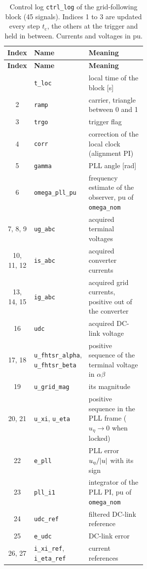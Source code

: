 \documentclass[11pt,a4paper]{scrartcl}
\newcommand{\ped}[1]{_{\mathrm{#1}}}
\newcommand{\code}[1]{\texttt{#1}}
\begin{document}
\begin{onehalfspace}
\small
\begin{longtable}{@{} c l p{0.56\linewidth} @{}}
	\caption[Control log of the grid-following block.]{Control log \code{ctrl\_log} of the grid-following block (45 signals). Indices 1 to 3 are updated every step $t\ped{c}$, the others at the trigger and held in between. Currents and voltages in pu.} \label{tab:log_gfl} \\
	\toprule
	\textbf{Index} & \textbf{Name} & \textbf{Meaning} \\
	\midrule
	\endfirsthead
	\toprule
	\textbf{Index} & \textbf{Name} & \textbf{Meaning} \\
	\midrule
	\endhead
	\bottomrule
	\endfoot
	\bottomrule
	\endlastfoot
	1 & \code{t\_loc} & local time of the block [\si{\second}] \\
	2 & \code{ramp} & carrier, triangle between 0 and 1 \\
	3 & \code{trgo} & trigger flag \\
	4 & \code{corr} & correction of the local clock (alignment PI) \\
	5 & \code{gamma} & PLL angle [\si{\radian}] \\
	6 & \code{omega\_pll\_pu} & frequency estimate of the observer, pu of \code{omega\_nom} \\
	7, 8, 9 & \code{ug\_abc} & acquired terminal voltages \\
	10, 11, 12 & \code{is\_abc} & acquired converter currents \\
	13, 14, 15 & \code{ig\_abc} & acquired grid currents, positive out of the converter \\
	16 & \code{udc} & acquired DC-link voltage \\
	17, 18 & \code{u\_fhtsr\_alpha}, \code{u\_fhtsr\_beta} & positive sequence of the terminal voltage in $\alpha\beta$ \\
	19 & \code{u\_grid\_mag} & its magnitude \\
	20, 21 & \code{u\_xi}, \code{u\_eta} & positive sequence in the PLL frame ($u_\eta \to 0$ when locked) \\
	22 & \code{e\_pll} & PLL error $u_\eta/\abs{u}$ with its sign \\
	23 & \code{pll\_i1} & integrator of the PLL PI, pu of \code{omega\_nom} \\
	24 & \code{udc\_ref} & filtered DC-link reference \\
	25 & \code{e\_udc} & DC-link error \\
	26, 27 & \code{i\_xi\_ref}, \code{i\_eta\_ref} & current references \\

\end{longtable}
\end{onehalfspace}
\end{document}
